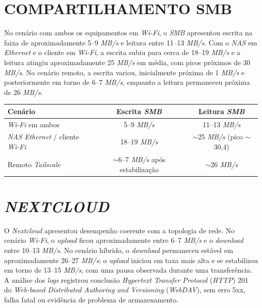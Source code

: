 \section{COMPARTILHAMENTO SMB}

No cenário com ambos os equipamentos em \textit{Wi-Fi}, o \textit{SMB} apresentou escrita na faixa de aproximadamente 5--9 \textit{MB/s} e leitura entre 11--13 \textit{MB/s}. Com o \textit{NAS} em \textit{Ethernet} e o cliente em \textit{Wi-Fi}, a escrita subiu para cerca de 18--19 \textit{MB/s} e a leitura atingiu aproximadamente 25 \textit{MB/s} em média, com picos próximos de 30 \textit{MB/s}. No cenário remoto, a escrita variou, inicialmente próxima de 1 \textit{MB/s} e posteriormente em torno de 6--7 \textit{MB/s}, enquanto a leitura permaneceu próxima de 26 \textit{MB/s}.

\begin{table}[H]
    \centering
    \small
    \renewcommand{\arraystretch}{1.15}
    \begin{tabularx}{\linewidth}{|>{\raggedright\arraybackslash}X|c|c|}
        \hline
        \textbf{Cenário} & \textbf{Escrita \textit{SMB}} & \textbf{Leitura \textit{SMB}} \\
        \hline
        \hline
        \textit{Wi-Fi} em ambos & 5--9 \textit{MB/s} & 11--13 \textit{MB/s} \\
        \hline
        \textit{NAS Ethernet} / cliente \textit{Wi-Fi} & 18--19 \textit{MB/s} & $\sim$25 \textit{MB/s} (pico $\sim$30,4) \\
        \hline
        Remoto \textit{Tailscale} & $\sim$6--7 \textit{MB/s} após estabilização & $\sim$26 \textit{MB/s} \\
        \hline
    \end{tabularx}
    \vspace{0.2cm}
    \fonteautoria
\end{table}

\begin{figure}[H]
    \centering
    \fonteautoria
\end{figure}

\section{\textit{NEXTCLOUD}}

O \textit{Nextcloud} apresentou desempenho coerente com a topologia de rede. No cenário \textit{Wi-Fi}, o \textit{upload} ficou aproximadamente entre 6--7 \textit{MB/s} e o \textit{download} entre 10--13 \textit{MB/s}. No cenário híbrido, o \textit{download} permaneceu estável em aproximadamente 26--27 \textit{MB/s}; o \textit{upload} iniciou em taxa mais alta e se estabilizou em torno de 13--15 \textit{MB/s}, com uma pausa observada durante uma transferência. A análise dos \textit{logs} registrou conclusão \textit{Hypertext Transfer Protocol} (\textit{HTTP}) 201 do \textit{Web-based Distributed Authoring and Versioning} (\textit{WebDAV}), sem erro 5xx, falha fatal ou evidência de problema de armazenamento.

